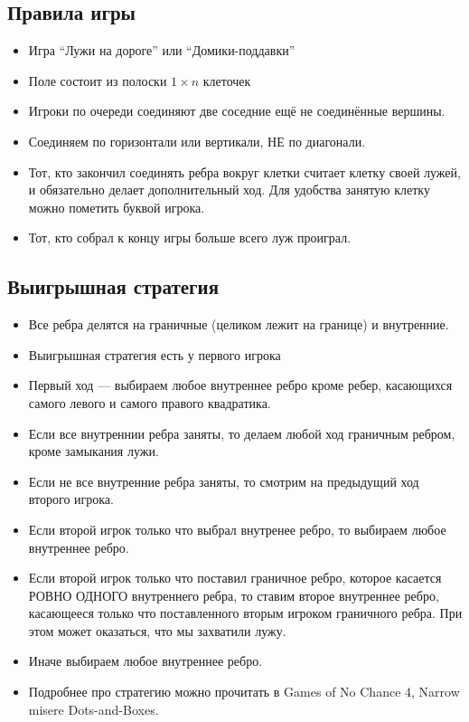 \documentclass[10pt,russian,]{article}
\providecommand{\tightlist}{%
  \setlength{\itemsep}{0pt}\setlength{\parskip}{0pt}}
\begin{document}
\subsection{Правила игры}\label{-}

\begin{itemize}
\tightlist
\item
  Игра ``Лужи на дороге'' или ``Домики-поддавки''
\item
  Поле состоит из полоски \(1 \times n\) клеточек
\item
  Игроки по очереди соединяют две соседние ещё не соединённые вершины.
\item
  Соединяем по горизонтали или вертикали, НЕ по диагонали.
\item
  Тот, кто закончил соединять ребра вокруг клетки считает клетку своей
  лужей, и обязательно делает дополнительный ход. Для удобства занятую
  клетку можно пометить буквой игрока.
\item
  Тот, кто собрал к концу игры больше всего луж проиграл.
\end{itemize}

\newpage

\subsection{Выигрышная стратегия}\label{-}

\begin{itemize}
\tightlist
\item
  Все ребра делятся на граничные (целиком лежит на границе) и
  внутренние.
\item
  Выигрышная стратегия есть у первого игрока
\item
  Первый ход --- выбираем любое внутреннее ребро кроме ребер, касающихся
  самого левого и самого правого квадратика.
\item
  Если все внутреннии ребра заняты, то делаем любой ход граничным
  ребром, кроме замыкания лужи.
\item
  Если не все внутренние ребра заняты, то смотрим на предыдущий ход
  второго игрока.
\item
  Если второй игрок только что выбрал внутренее ребро, то выбираем любое
  внутреннее ребро.
\item
  Если второй игрок только что поставил граничное ребро, которое
  касается РОВНО ОДНОГО внутреннего ребра, то ставим второе внутреннее
  ребро, касающееся только что поставленного вторым игроком граничного
  ребра. При этом может оказаться, что мы захватили лужу.
\item
  Иначе выбираем любое внутреннее ребро.
\item
  Подробнее про стратегию можно прочитать в Games of No Chance 4, Narrow
  misere Dots-and-Boxes.
\end{itemize}
\end{document}
